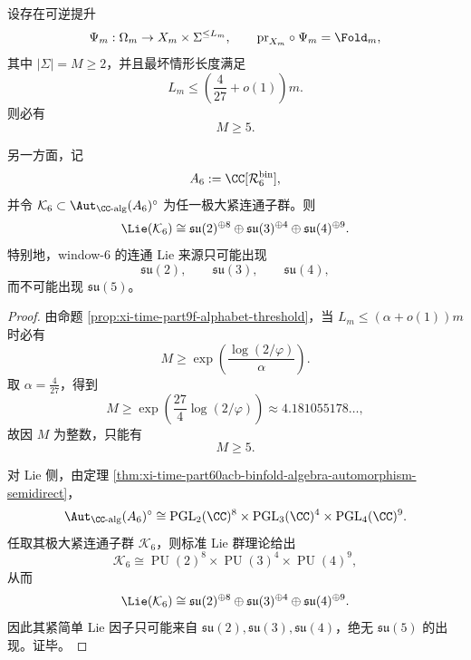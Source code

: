 \begin{theorem}\label{thm:xi-time-part9zj-quinary-language-window6-lie-mismatch}
设存在可逆提升
\[
\Psi_m:\Omega_m\to X_m\times \Sigma^{\le L_m},
\qquad
\mathrm{pr}_{X_m}\circ\Psi_m=\Fold_m,
\]
其中 \(|\Sigma|=M\ge 2\)，并且最坏情形长度满足
\[
L_m\le \left(\frac{4}{27}+o(1)\right)m.
\]
则必有
\[
M\ge 5.
\]

另一方面，记
\[
A_6:=\CC[\mathcal R_6^{\mathrm{bin}}],
\]
并令 \(\mathcal K_6\subset \Aut_{\CC\text{-alg}}(A_6)^\circ\) 为任一极大紧连通子群。则
\[
\Lie(\mathcal K_6)
\cong
\mathfrak{su}(2)^{\oplus 8}\oplus
\mathfrak{su}(3)^{\oplus 4}\oplus
\mathfrak{su}(4)^{\oplus 9}.
\]
特别地，window-\(6\) 的连通 Lie 来源只可能出现
\[
\mathfrak{su}(2),\qquad \mathfrak{su}(3),\qquad \mathfrak{su}(4),
\]
而不可能出现 \(\mathfrak{su}(5)\)。
\end{theorem}
\begin{proof}
由命题 \ref{prop:xi-time-part9f-alphabet-threshold}，当
\(
L_m\le (\alpha+o(1))m
\)
时必有
\[
M\ge \exp\!\left(\frac{\log(2/\varphi)}{\alpha}\right).
\]
取 \(\alpha=\frac{4}{27}\)，得到
\[
M\ge \exp\!\left(\frac{27}{4}\log(2/\varphi)\right)\approx 4.181055178\ldots,
\]
故因 \(M\) 为整数，只能有
\[
M\ge 5.
\]

对 Lie 侧，由定理 \ref{thm:xi-time-part60acb-binfold-algebra-automorphism-semidirect}，
\[
\Aut_{\CC\text{-alg}}(A_6)^\circ
\cong
\operatorname{PGL}_2(\CC)^8\times
\operatorname{PGL}_3(\CC)^4\times
\operatorname{PGL}_4(\CC)^9.
\]
任取其极大紧连通子群 \(\mathcal K_6\)，则标准 Lie 群理论给出
\[
\mathcal K_6
\cong
\operatorname{PU}(2)^8\times
\operatorname{PU}(3)^4\times
\operatorname{PU}(4)^9,
\]
从而
\[
\Lie(\mathcal K_6)
\cong
\mathfrak{su}(2)^{\oplus 8}\oplus
\mathfrak{su}(3)^{\oplus 4}\oplus
\mathfrak{su}(4)^{\oplus 9}.
\]
因此其紧简单 Lie 因子只可能来自 \(\mathfrak{su}(2),\mathfrak{su}(3),\mathfrak{su}(4)\)，绝无 \(\mathfrak{su}(5)\) 的出现。证毕。
\end{proof}

